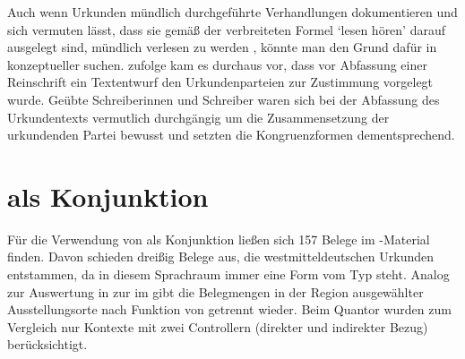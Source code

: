Auch wenn Urkunden mündlich durchgeführte
Verhandlungen dokumentieren und sich vermuten lässt, dass sie gemäß der
verbreiteten Formel  `lesen hören' darauf ausgelegt sind,
mündlich verlesen zu werden
\autocites[595]{schmidtwiegand1998b}[31]{schulze2011}, könnte man den Grund
dafür in konzeptueller  suchen.
\citet[588--589]{frenz1998b} zufolge kam es durchaus vor, dass vor Abfassung
einer Reinschrift ein Textentwurf den Urkundenparteien zur Zustimmung vorgelegt
wurde. Geübte Schreiberinnen und Schreiber waren sich bei der Abfassung des
Urkundentexts vermutlich durchgängig um die Zusammensetzung der urkundenden
Partei bewusst und setzten die Kongruenzformen dementsprechend.



\section{ als Konjunktion}
\label{sec:caokonjunktion}

Für die Verwendung von  als Konjunktion ließen sich 157 Belege im
\CAO{}-Material finden. Davon schieden dreißig Belege aus, die
westmitteldeutschen Urkunden entstammen, da in diesem
Sprachraum immer eine Form vom Typ  steht.
Analog zur Auswertung in  zur 
im \CAO{} gibt  die Belegmengen in der Region
ausgewählter Ausstellungs\-orte nach Funktion von  getrennt wieder.
Beim Quantor wurden zum Vergleich nur Kontexte mit zwei
Controllern (direkter und indirekter Bezug) berücksichtigt.

